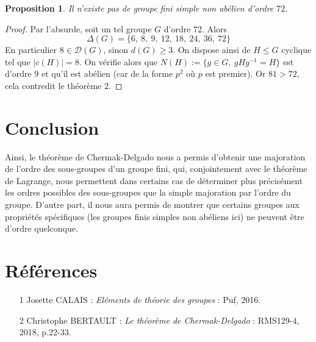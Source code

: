 \documentclass[10pt,a4paper]{article}
\newtheorem{prop}{Proposition}
\begin{document}
\begin{prop}
    Il n'existe pas de groupe fini simple non abélien d'ordre $72$.
\end{prop}

\begin{proof}
    Par l'absurde, soit un tel groupe $G$ d'ordre $72$. Alors $$\Delta(G)= \{6,\:8,\:9,\:12,\:18,\:24,\:36,\:72\}$$ En particulier $8 \in \mathcal{D}(G)$, sinon $d(G)\geq 3$. On dispose ainsi de $H \leq G$ cyclique tel que $|c(H)|= 8$. On vérifie alors que $N(H) := \{g \in G, \: gHg^{-1}=H\}$ est d'ordre $9$ et qu'il est abélien (car de la forme $p^2$ où $p$ est premier). Or $81 > 72$, cela contredit le théorème 2.
\end{proof}

\section*{Conclusion}

Ainsi, le théorème de Chermak-Delgado nous a permis d'obtenir une majoration de l'ordre des sous-groupes d'un groupe fini, qui, conjointement avec le théorème de Lagrange, nous permettent dans certains cas de déterminer plus précisément les ordres possibles des sous-groupes que la simple majoration par l'ordre du groupe. D'autre part, il nous aura permis de montrer que certains groupes aux propriétés spécifiques (les groupes finis simples non abéliens ici) ne peuvent être d'ordre quelconque.

\section*{Références}
\begin{itemize}


    \item[1] Josette CALAIS : \textit{Eléments de théorie des groupes} : Puf, 2016.

    \item[2] Christophe BERTAULT : \textit{Le théorème de Chermak-Delgado} : RMS129-4, 2018, p.22-33.

\end{itemize}
\end{document}
